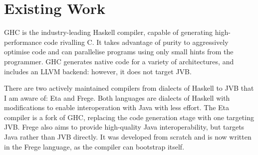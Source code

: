 \documentclass[dissertation.tex]{subfiles}
\begin{document}
\section{Existing Work}
{
    GHC is the industry-leading Haskell compiler, capable of generating high-performance code rivalling C\cite{ghc-vs-c}. It takes advantage of purity to aggressively optimise code and can parallelise programs using only small hints from the programmer\cite{ghc-parallel}. GHC generates native code for a variety of architectures, and includes an LLVM backend: however, it does not target JVB.

    There are two actively maintained compilers from dialects of Haskell to JVB that I am aware of: Eta and Frege. Both languages are dialects of Haskell with modifications to enable interoperation with Java with less effort. The Eta compiler is a fork of GHC, replacing the code generation stage with one targeting JVB. Frege also aims to provide high-quality Java interoperability, but targets Java rather than JVB directly. It was developed from scratch and is now written in the Frege language, as the compiler can bootstrap itself. 
}
\end{document}
